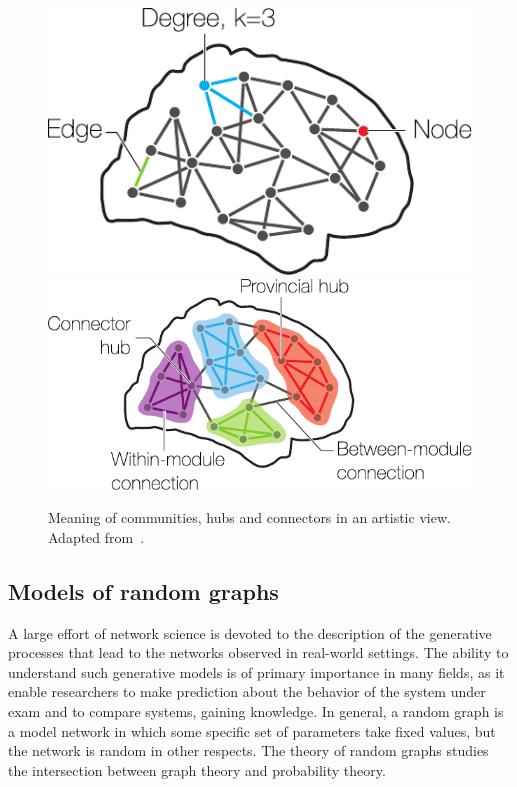 \begin{figure}[htb!]
\centering
\hfill\includegraphics[height=0.25\textwidth]{images/brain_network_basics.pdf}\hfill
\includegraphics[height=0.25\textwidth]{images/brain_network_communities.pdf}\hfill
\caption{Meaning of communities, hubs and connectors in an artistic view. Adapted from~\cite{sporns2016}.}
\label{fig:brain_network_communities}
\end{figure}


\subsection{Models of random graphs}\label{sec:models_random_graph}
A large effort of network science is devoted to the description of the generative processes that lead to the networks observed in real-world settings. The ability to understand such generative models is of primary importance in many fields, as it enable researchers to make prediction about the behavior of the system under exam and to compare systems, gaining knowledge.
In general, a random graph is a model network in which some specific set of parameters take fixed values, but the network is random in other respects.
The theory of random graphs studies the intersection between graph theory and probability theory.

